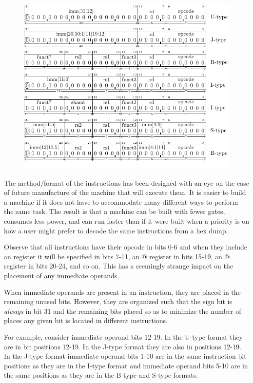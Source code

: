 \begin{figure}[ht]
  \includegraphics{figures/chapter05/riscvFormats.pdf}
\label{Figure:riscvFormats}
\end{figure}

The method/format of the instructions has been designed with an eye on
the ease of future manufacture of the machine that will execute them.  It is
easier to build a machine if it does not have to accommodate many different
ways to perform the same task.  The result is that a machine can be
built with fewer gates, consumes less power, and can run faster than
if it were built when a priority is on how a user might prefer to decode
the same instructions from a hex dump.

Observe that all instructions have their opcode in bits 0-6 and when they
include an \verb@rd@ register it will be specified in bits 7-11,
an @ register in bits 15-19, an @ register in bits 20-24,
and so on.  This has a seemingly strange impact on the placement of any
immediate operands.

When immediate operands are present in an instruction, they are placed in
the remaining unused bits.  However, they are organized such that
the sign bit is {\em always} in bit 31 and the remaining bits placed so
as to minimize the number of places any given bit is located in different
instructions.

For example, consider immediate operand bits 12-19.  In the U-type format
they are in bit positions 12-19.  In the J-type format they are also in positions
12-19.  In the J-type format immediate operand bits 1-10 are in the same
instruction bit positions as they are in the I-type format and immediate
operand bits 5-10 are in the same positions as they are in the B-type and
S-type formats.


